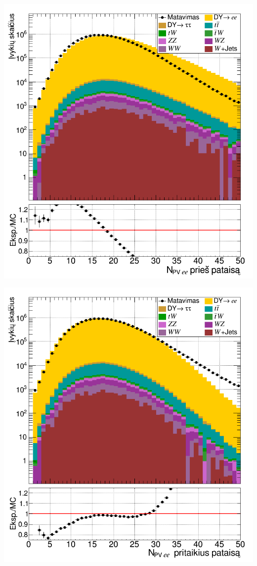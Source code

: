 \documentclass[a4paper, 12pt]{article}
\begin{document}
\vspace{0.5cm}
\begin{minipage}[t]{0.48\textwidth}
	\includegraphics[width=\linewidth]{nVTXee_before.png}
\end{minipage}
\hfill
\begin{minipage}[t]{0.48\textwidth}
	\includegraphics[width=\linewidth]{nVTXee_after.png}
\end{minipage}
\end{document}
